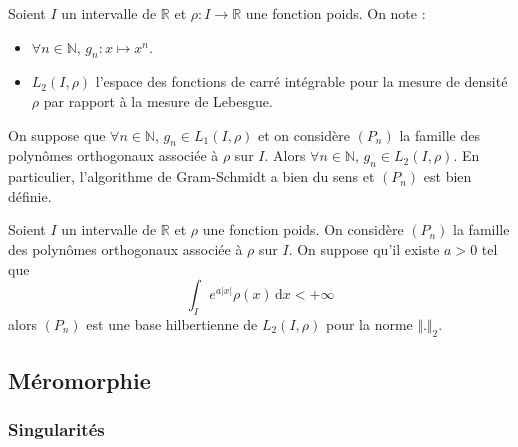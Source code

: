 
  \begin{notation}
    Soient $I$ un intervalle de $\mathbb{R}$ et $\rho : I \rightarrow \mathbb{R}$ une fonction poids. On note :
    \begin{itemize}
      \item $\forall n \in \mathbb{N}$, $g_n : x \mapsto x^n$.
      \item $L_2(I, \rho)$ l'espace des fonctions de carré intégrable pour la mesure de densité $\rho$ par rapport à la mesure de Lebesgue.
    \end{itemize}
  \end{notation}


  \begin{lemma}
    On suppose que $\forall n \in \mathbb{N}$, $g_n \in L_1(I, \rho)$ et on considère $(P_n)$ la famille des polynômes orthogonaux associée à $\rho$ sur $I$. Alors $\forall n \in \mathbb{N}$, $g_n \in L_2(I, \rho)$. En particulier, l'algorithme de Gram-Schmidt a bien du sens et $(P_n)$ est bien définie.
  \end{lemma}


  \begin{application}
    Soient $I$ un intervalle de $\mathbb{R}$ et $\rho$ une fonction poids. On considère $(P_n)$ la famille des polynômes orthogonaux associée à $\rho$ sur $I$.
    \newpar
    On suppose qu'il existe $a > 0$ tel que
    \[ \int_I e^{a \vert x \vert} \rho(x) \, \mathrm{d}x < +\infty \]
    alors $(P_n)$ est une base hilbertienne de $L_2(I, \rho)$ pour la norme $\Vert . \Vert_2$.
  \end{application}

  \subsection{Méromorphie}

  \subsubsection{Singularités}


